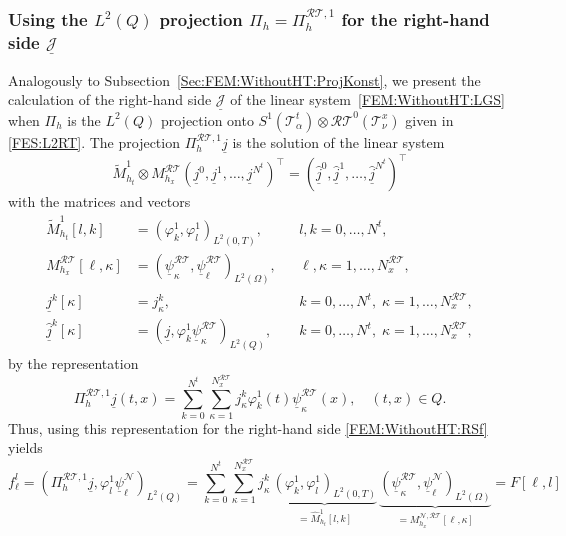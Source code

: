 \documentclass[a4paper,11pt]{article}
\renewcommand{\vec}[1]{\underline{#1}}
\begin{document}
\subsubsection{Using the $L^2(Q)$ projection $\Pi_h=\Pi_h^{\mathcal{RT},1}$ for the right-hand side $\vec{\mathcal J}$} \label{Sec:FEM:WithoutHT:ProjRT}

Analogously to Subsection~\ref{Sec:FEM:WithoutHT:ProjKonst}, we present the calculation of the right-hand side $\vec{\mathcal J}$ of the linear system~\eqref{FEM:WithoutHT:LGS} when $\Pi_h$ is the $L^2(Q)$ projection onto $S^1(\mathcal T^t_\alpha) \otimes \mathcal{RT}^0(\mathcal T^x_\nu)$ given in \eqref{FES:L2RT}. The projection $\Pi_h^{\mathcal{RT},1} \vec j$ is the solution of the linear system
\begin{equation} \label{FEM:WithoutHT:jProjRT}
	\widetilde{M}_{h_t}^1 \otimes M_{h_x}^\mathcal{RT} ( \vec j^0, \vec j^1, \dots, \vec j^{N^t})^\top = (\hat{\vec j}^0,\hat{\vec j}^1,\dots, \hat{ \vec j}^{N^t})^\top
\end{equation}
with the matrices and vectors
\begin{align}
	\widetilde{M}_{h_t}^1[l,k] &= (\varphi^1_k,\varphi^1_l)_{L^2(0,T)},  &&l,k=0,\dots,N^t,  \label{FEM:WithoutHT:MatrixMhtVoll} \\
	M_{h_x}^\mathcal{RT}[\ell,\kappa] &= (\vec \psi^\mathcal{RT}_\kappa, \vec \psi^\mathcal{RT}_\ell)_{L^2(\Omega)},  &&\ell,\kappa=1,\dots,N_x^{\mathcal{RT}}, \nonumber \\
	\vec j^k[\kappa] &= j^k_\kappa ,  &&k=0,\dots,N^t, \; \kappa=1,\dots, N_x^{\mathcal{RT}}, \nonumber \\
	\hat{\vec j}^k[\kappa] &= (\vec j, \varphi^1_k \vec \psi^\mathcal{RT}_\kappa)_{L^2(Q)} ,  &&k=0,\dots,N^t, \; \kappa=1,\dots, N_x^{\mathcal{RT}},  \nonumber
\end{align}
by the representation
\begin{equation*}
	\Pi_h^{\mathcal{RT},1} \vec j(t,x) = \sum_{k=0}^{N^t} \sum_{\kappa=1}^{N_x^{\mathcal{RT}}} j^k_\kappa \varphi^1_k(t) \vec \psi^\mathcal{RT}_\kappa(x), \quad (t,x) \in Q.
\end{equation*}
Thus, using this representation for the right-hand side \eqref{FEM:WithoutHT:RSf} yields
\begin{equation*}
	f_\ell^l = (\Pi_h^{\mathcal{RT},1} \vec j, \varphi^1_l \vec \psi^\mathcal{N}_{\ell} )_{L^2(Q)} =  \sum_{k=0}^{N^t} \sum_{\kappa=1}^{N_x^{\mathcal{RT}}} j^k_\kappa \, \underbrace{ (\varphi^1_k, \varphi^1_l)_{L^2(0,T)}}_{=\widehat M_{h_t}^1[l,k]} \, \underbrace{ (\vec \psi^\mathcal{RT}_\kappa, \vec \psi^\mathcal{N}_{\ell})_{L^2(\Omega)}}_{=M_{h_x}^{\mathcal{N},\mathcal{RT}}[\ell,\kappa]}  = F[\ell,l]
\end{equation*}
\end{document}
